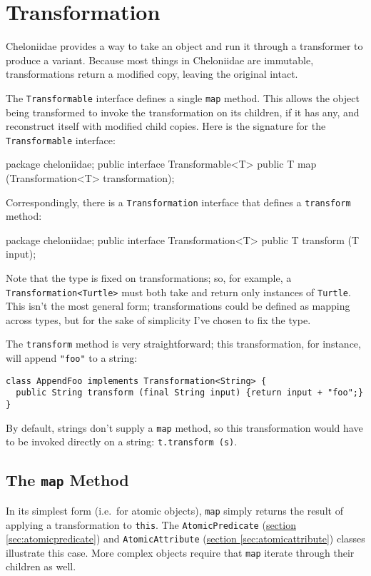 \documentclass{report}
\newcommand{\Ref}[2]{\hyperref[#2]{#1 \ref*{#2}}}
\begin{document}
\chapter {Transformation} \label{sec:transformation}
    Cheloniidae provides a way to take an object and run it through a transformer to produce a variant. Because most things in Cheloniidae are immutable,
    transformations return a modified copy, leaving the original intact.

    The {\tt Transformable} interface defines a single {\tt map} method. This allows the object being transformed to invoke the transformation on its children,
    if it has any, and reconstruct itself with modified child copies. Here is the signature for the {\tt Transformable} interface:

\begin{javacode}
package cheloniidae;
public interface Transformable<T> {
  public T map (Transformation<T> transformation);
}
\end{javacode}

    Correspondingly, there is a {\tt Transformation} interface that defines a {\tt transform} method:

\begin{javacode}
package cheloniidae;
public interface Transformation<T> {
  public T transform (T input);
}
\end{javacode}

    Note that the type is fixed on transformations; so, for example, a \verb|Transformation<Turtle>| must both take and return only instances of {\tt Turtle}.
    This isn't the most general form; transformations could be defined as mapping across types, but for the sake of simplicity I've chosen to fix the type.
    
    The {\tt transform} method is very straightforward; this transformation, for instance, will append \verb|"foo"| to a string:

\begin{verbatim}
class AppendFoo implements Transformation<String> {
  public String transform (final String input) {return input + "foo";}
}
\end{verbatim}

    By default, strings don't supply a {\tt map} method, so this transformation would have to be invoked directly on a string: \verb|t.transform (s)|.

\section {The {\tt map} Method} \label{sec:the---tt-map--method}
      In its simplest form (i.e.~for atomic objects), {\tt map} simply returns the result of applying a transformation to {\tt this}. The {\tt AtomicPredicate}
      (\Ref{section}{sec:atomicpredicate}) and {\tt AtomicAttribute} (\Ref{section}{sec:atomicattribute}) classes illustrate this case. More complex objects
      require that {\tt map} iterate through their children as well.
\end{document}
